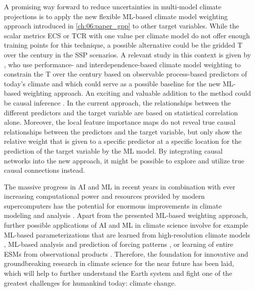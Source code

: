 A promising way forward to reduce uncertainties in multi-model climate
projections is to apply the new flexible \ac{ML}-based climate model weighting
approach introduced in \cref{ch:06:paper_gpp} to other target variables. While
the scalar metrics \ac{ECS} or \ac{TCR} with one value per climate model do not
offer enough training points for this technique, a possible alternative could
be the gridded \acl{T} over the  century in the \ac{SSP} scenarios. A
relevant study in this context is given by \textcite{Brunner2020}, who use
performance- and interdependence-based climate model weighting to constrain the
\acl{T} over the  century based on observable process-based predictors
of today's climate and which could serve as a possible baseline for the new
\ac{ML}-based weighting approach. An exciting and valuable addition to the
method could be causal inference \autocite{Nowack2020, Runge2019}. In the
current approach, the relationships between the different predictors and the
target variable are based on statistical correlation alone. Moreover, the local
feature importance maps do not reveal true causal relationships between the
predictors and the target variable, but only show the relative weight that is
given to a specific predictor at a specific location for the prediction of the
target variable by the \ac{ML} model. By integrating causal networks into the
new approach, it might be possible to explore and utilize true causal
connections instead.

The massive progress in \ac{AI} and \ac{ML} in recent years in combination with
ever increasing computational power and resources provided by modern
supercomputers has the potential for enormous improvements in climate modeling
and analysis \autocite{Reichstein2019}. Apart from the presented \ac{ML}-based
weighting approach, further possible applications of \ac{AI} and \ac{ML} in
climate science involve for example \ac{ML}-based parameterizations that are
learned from high-resolution climate models \autocite{Gentine2018, Rasp2018},
\ac{ML}-based analysis and prediction of forcing patterns \autocite{Barnes2019,
  Mansfield2020}, or learning of entire \acp{ESM} from observational products
\autocite{Geer2021}. Therefore, the foundation for innovative and
groundbreaking research in climate science for the near future has been laid,
which will help to further understand the Earth system and fight one of the
greatest challenges for humankind today: climate change.
